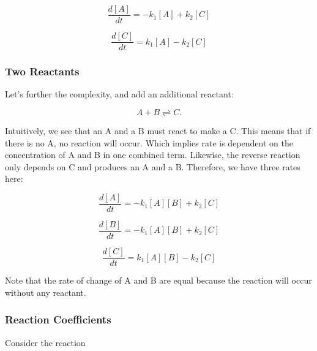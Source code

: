 \documentclass[11pt, letterpaper, english]{article}
\begin{document}
    \begin{equation}
        \frac{d [A]}{d t}=-k_1[A]+k_2[C]
         \label{Eq10}
    \end{equation}


    \begin{equation}
        \frac{d [C]}{d t}=k_1[A]-k_2[C]
         \label{Eq11}
    \end{equation}

    \subsubsection{Two Reactants}

    \par{Let’s further the complexity, and add an additional reactant:}

    \begin{equation}
        A+B \rightleftharpoons C.
        \label{eq12}
    \end{equation}

    \par{Intuitively, we see that an A and a B must react to make a C. This means that if there is no A, no reaction will occur. Which implies rate is dependent on the concentration of A and B in one combined term. Likewise, the reverse reaction only depends on C and produces an A and a B. Therefore, we have three rates here:}

    \begin{equation}
        \frac{d [A]}{d t}=-k_1[A][B]+k_2[C]
        \label{eq13}
    \end{equation}

    \begin{equation}
        \frac{d [B]}{d t}=-k_1[A][B]+k_2[C]
        \label{eq14}
    \end{equation}

    \begin{equation}
        \frac{d [C]}{d t}=k_1[A][B]-k_2[C]
    \end{equation}

    \par{Note that the rate of change of A and B are equal because the reaction will occur without any reactant.} 

    \subsubsection{Reaction Coefficients}

    \par{Consider the reaction}
\end{document}
